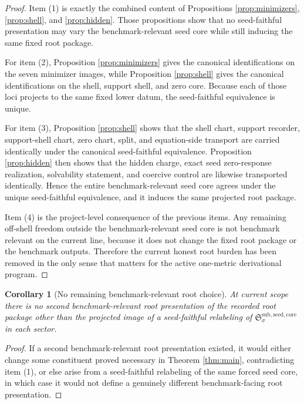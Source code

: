 \documentclass[11pt]{article}
\newcommand{\SeedCore}{\mathfrak S^{\mathrm{sub,seed,core}}}
\newtheorem{corollary}{Corollary}
\begin{document}
\begin{proof}
Item (1) is exactly the combined content of Propositions \ref{prop:minimizers}, \ref{prop:shell}, and \ref{prop:hidden}. Those propositions show that no seed-faithful presentation may vary the benchmark-relevant seed core while still inducing the same fixed root package.

For item (2), Proposition \ref{prop:minimizers} gives the canonical identifications on the seven minimizer images, while Proposition \ref{prop:shell} gives the canonical identifications on the shell, support shell, and zero core. Because each of those loci projects to the same fixed lower datum, the seed-faithful equivalence is unique.

For item (3), Proposition \ref{prop:shell} shows that the shell chart, support recorder, support-shell chart, zero chart, split, and equation-side transport are carried identically under the canonical seed-faithful equivalence. Proposition \ref{prop:hidden} then shows that the hidden charge, exact seed zero-response realization, solvability statement, and coercive control are likewise transported identically. Hence the entire benchmark-relevant seed core agrees under the unique seed-faithful equivalence, and it induces the same projected root package.

Item (4) is the project-level consequence of the previous items. Any remaining off-shell freedom outside the benchmark-relevant seed core is not benchmark relevant on the current line, because it does not change the fixed root package or the benchmark outputs. Therefore the current honest root burden has been removed in the only sense that matters for the active one-metric derivational program.
\end{proof}

\begin{corollary}[No remaining benchmark-relevant root choice]
\label{cor:nofreedom}
At current scope there is no second benchmark-relevant root presentation of the recorded root package other than the projected image of a seed-faithful relabeling of \(\SeedCore_{\sigma}\) in each sector.
\end{corollary}

\begin{proof}
If a second benchmark-relevant root presentation existed, it would either change some constituent proved necessary in Theorem \ref{thm:main}, contradicting item (1), or else arise from a seed-faithful relabeling of the same forced seed core, in which case it would not define a genuinely different benchmark-facing root presentation.
\end{proof}
\end{document}
